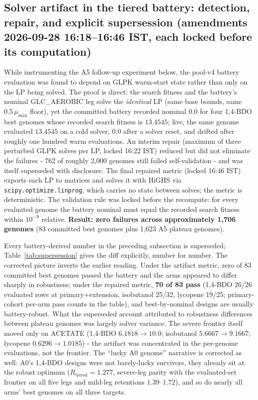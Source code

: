 \documentclass[12pt,a4paper]{article}
\begin{document}
\subsection{Solver artifact in the tiered battery: detection, repair, and explicit supersession (amendments 2026-09-28 16:18--16:46 IST, each locked before its computation)}
While instrumenting the A5 follow-up experiment below, the pool-v4 battery evaluation was found to depend on GLPK warm-start state rather than only on the LP being solved. The proof is direct: the search fitness and the battery's nominal GLC\_AEROBIC leg solve the \emph{identical} LP (same base bounds, same $0.5\,\mu_{\max}$ floor), yet the committed battery recorded nominal $0.0$ for four 1,4-BDO best genomes whose recorded search fitness is $13.4545$; live, the same genome evaluated $13.4545$ on a cold solver, $0.0$ after a solver reset, and drifted after roughly one hundred warm evaluations. An interim repair (maximum of three perturbed GLPK solves per LP, locked 16:22 IST) reduced but did not eliminate the failures - 762 of roughly 2{,}000 genomes still failed self-validation - and was itself superseded with disclosure. The final repaired metric (locked 16:46 IST) exports each LP to matrices and solves it with HiGHS via \texttt{scipy.optimize.linprog}, which carries no state between solves; the metric is deterministic. The validation rule was locked before the recompute: for every evaluated genome the battery nominal must equal the recorded search fitness within $10^{-9}$ relative. \textbf{Result: zero failures across approximately 1{,}706 genomes} (83 committed best genomes plus 1{,}623 A5 plateau genomes).

Every battery-derived number in the preceding subsection is superseded; Table~\ref{tab:supersession} gives the diff explicitly, number for number. The corrected picture inverts the earlier reading. Under the artifact metric, zero of 83 committed best genomes passed the battery and the arms appeared to differ sharply in robustness; under the repaired metric, \textbf{70 of 83 pass} (1,4-BDO 26/26 evaluated rows at primary+extension, isobutanol 25/32, lycopene 19/25; primary-cohort per-arm pass counts in the table), and best-by-nominal designs are usually battery-robust. What the superseded account attributed to robustness differences between plateau genomes was largely solver variance. The severe frontier itself moved only on ACETATE (1,4-BDO $6.1818 \to 10.0$; isobutanol $5.6667 \to 9.1667$; lycopene $0.6296 \to 1.0185$) - the artifact was concentrated in the per-genome evaluations, not the frontier. The ``lucky A0 genome'' narrative is corrected as well: A0's 1,4-BDO designs were not barely-lucky survivors, they already sit at the robust optimum ($R_{\mathrm{tiered}} = 1.277$, severe-leg parity with the evaluated-set frontier on all five legs and mild-leg retentions $1.39$--$1.72$), and so do nearly all arms' best genomes on all three targets.
\end{document}

